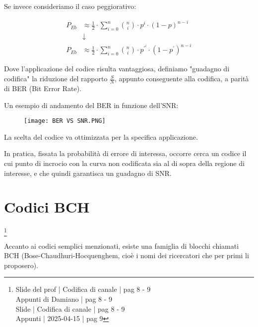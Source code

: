 Se invece consideriamo il caso peggiorativo: 

{
    \Large 
    \begin{equation}
        \begin{split}
            P_{Eb}
            &\approx
            \frac{1}{2}
        \cdot
         \sum_{i = 0}^{n} 
        \binom{n}{i} \cdot p^{i} \cdot (1 - p)^{n-i}
        \\
        &\downarrow
        \\
        P_{Eb}
            &\approx
            \frac{1}{2}
        \cdot
         \sum_{i = 0}^{n} 
        \binom{n}{i} \cdot p^{'^{i}} \cdot (1 - p^{'})^{n-i}
    \end{split}
    \end{equation}
}

Dove l'applicazione del codice risulta vantaggiosa, 
definiamo "guadagno di codifica" la riduzione del rapporto $\frac{S}{N}$, 
appunto conseguente alla codifica, a parità di BER (Bit Error Rate). \newline 

Un esempio di andamento del BER in funzione dell'SNR: 

\begin{figure}[h]
    \centering
    \texttt{[image: BER VS SNR.PNG]}
\end{figure}

La scelta del codice va ottimizzata per la specifica applicazione. \newline 

In pratica, fissata la probabilità di errore di interessa, occorre cerca un codice il cui punto di incrocio con la curva non codificata sia al di sopra della regione di interesse, 
e che quindi garantisca un guadagno di SNR. \newline 

\newpage 

\section{Codici BCH}
\footnote{Slide del prof | Codifica di canale | pag 8 - 9 \\
Appunti di Damiano | pag 8 - 9 \\ 
Slide | Codifica di canale | pag  8 - 9\\ 
Appunti | 2025-04-15 | pag 9
}

Accanto ai codici semplici menzionati, esiste una famiglia di blocchi chiamati BCH (Bose-Chaudhuri-Hocquenghem, cioè i nomi dei ricercatori che per primi li proposero). \newline 

